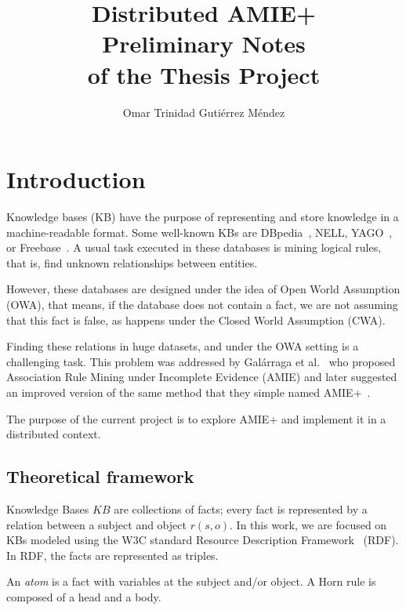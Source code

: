 \documentclass{article}
\title{
Distributed AMIE+\\
\large Preliminary Notes\\
of the Thesis Project\\
}
\author{Omar Trinidad Guti\'errez M\'endez}
\begin{document}
\maketitle

\section{Introduction}

Knowledge bases (KB) have the purpose of representing and store knowledge in a
machine-readable format. Some well-known KBs are DBpedia~\cite{dbpedia-swj},
NELL, YAGO~\cite{suchanek2007yago}, or Freebase~\cite{bollacker2008freebase}. A
usual task executed in these databases is mining logical rules, that is, find
unknown relationships between entities.

However,  these databases are designed under the idea of Open World Assumption
(OWA), that means, if the database does not contain a fact, we are not assuming
that this fact is false, as happens under the Closed World Assumption (CWA).

Finding these relations in huge datasets, and under the OWA setting is a
challenging task. This problem was addressed by Galárraga et
al.~\cite{galarraga2013amie}  who proposed Association Rule Mining under
Incomplete Evidence (AMIE) and later suggested an improved version of the same
method that they simple named AMIE+~\cite{galarraga2015fast}.

The purpose of the current project is to explore AMIE+ and implement it in a
distributed context.

\subsection{Theoretical framework}

Knowledge Bases $KB$ are collections of facts; every fact is represented by a
relation between a subject and object $r(s, o)$. In this work, we are focused
on KBs modeled using the W3C standard Resource Description Framework~\cite{rdf}
(RDF). In RDF, the facts are represented as triples.

%    

An \textit{atom} is a fact with variables at the subject and/or object. A Horn
rule is composed of a head and a body.
\end{document}
